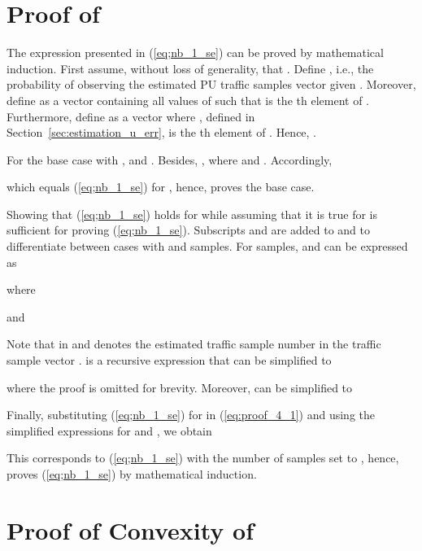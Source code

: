 \documentclass[11pt,draftclsnofoot,journal,onecolumn]{IEEEtran}
\begin{document}
\appendices

\renewcommand{\theequation}{\thesection.\arabic{equation}}

\section{Proof of }
\label{sec:math_ind_vu}

\begin{IEEEproof}The expression presented in (\ref{eq;nb_1_se}) can be proved by mathematical induction. First assume, without loss of generality, that . Define , i.e., the probability of observing the estimated PU traffic samples vector  given . Moreover, define  as a vector containing all values of  such that  is the th element of . Furthermore, define  as a vector where , defined in Section~\ref{sec:estimation_u_err}, is the th element of . Hence, .

For the base case with ,  and . Besides, , where  and . Accordingly, \addtocounter{equation}{1}

which equals (\ref{eq;nb_1_se}) for , hence, proves the base case.

Showing that (\ref{eq;nb_1_se}) holds for  while assuming that it is true for  is sufficient for proving (\ref{eq;nb_1_se}). Subscripts  and  are added to  and  to differentiate between cases with  and  samples. For  samples,  and can be expressed as

where

and

Note that  in  and  denotes the estimated traffic sample number  in the traffic sample vector .  is a recursive expression that can be simplified to

where the proof is omitted for brevity. Moreover,  can be simplified to

Finally, substituting (\ref{eq;nb_1_se}) for  in (\ref{eq:proof_4_1}) and using the simplified expressions for  and , we obtain

This corresponds to (\ref{eq;nb_1_se}) with the number of samples set to , hence, proves (\ref{eq;nb_1_se}) by mathematical induction.\end{IEEEproof}

\section{Proof of Convexity of }
\label{sec:V_u_conv}
\end{document}
